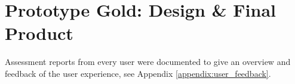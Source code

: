 \chapter{Prototype Gold: Design \& Final Product}


Assessment reports from every user were documented to give an overview and feedback of the user experience, see Appendix \ref{appendix:user_feedback}.